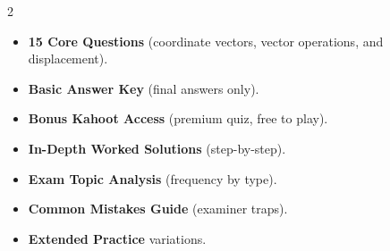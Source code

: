 \documentclass[11pt,a4paper]{article}
\newcommand{\FullReleaseDate}{April 30, 2026}
\begin{document}
\vspace{8pt}

\begin{multicols}{2}
  \begin{tcolorbox}[card, title=\sffamily\bfseries\textcolor{white}{\faHandPointDown\ TODAY (Simplified Version)}, colbacktitle=mainblue, boxed title style={sharp corners, boxrule=0pt}]
    \begin{itemize}[leftmargin=1.2em, itemsep=2pt]
      \item \small \textbf{15 Core Questions} (coordinate vectors, vector operations, and displacement).
      \item \small \textbf{Basic Answer Key} (final answers only).
      \item \small \textbf{Bonus Kahoot Access} (premium quiz, free to play).
    \end{itemize}
  \end{tcolorbox}

  \columnbreak

  \begin{tcolorbox}[card, title=\sffamily\bfseries\textcolor{white}{\faRocket\ ON \FullReleaseDate\ (Full Upgrade)}, colbacktitle=mainblue, boxed title style={sharp corners, boxrule=0pt}]
    \begin{itemize}[leftmargin=1.2em, itemsep=2pt]
      \item \small \textbf{In-Depth Worked Solutions} (step-by-step).
      \item \small \textbf{Exam Topic Analysis} (frequency by type).
      \item \small \textbf{Common Mistakes Guide} (examiner traps).
      \item \small \textbf{Extended Practice} variations.
    \end{itemize}
  \end{tcolorbox}
\end{multicols}
\end{document}
